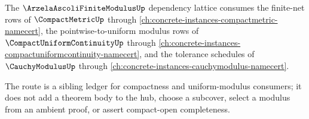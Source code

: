 The $\ArzelaAscoliFiniteModulusUp$ dependency lattice consumes the finite-net rows of $\CompactMetricUp$ through \autoref{ch:concrete-instances-compactmetric-namecert}, the pointwise-to-uniform modulus rows of $\CompactUniformContinuityUp$ through \autoref{ch:concrete-instances-compactuniformcontinuity-namecert}, and the tolerance schedules of $\CauchyModulusUp$ through \autoref{ch:concrete-instances-cauchymodulus-namecert}.

The route is a sibling ledger for compactness and uniform-modulus consumers; it does not add a theorem body to the hub, choose a subcover, select a modulus from an ambient proof, or assert compact-open completeness.
